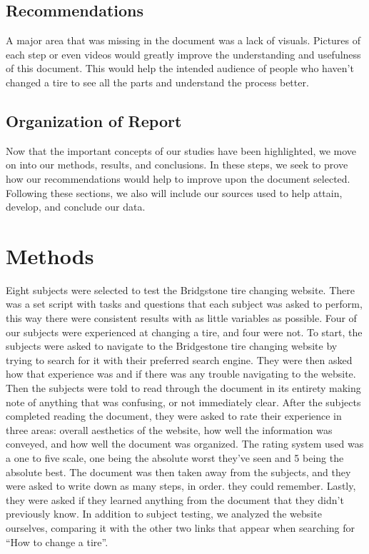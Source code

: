 \documentclass[12pt,A4paper]{article}
\begin{document}
		\subsection{Recommendations}
		A major area that was missing in the document was a lack of visuals. Pictures of each step or even videos would greatly improve the understanding and usefulness of this document. This would help the intended audience of people who haven’t changed a tire to see all the parts and understand the process better.

		\subsection{Organization of Report}
		Now that the important concepts of our studies have been highlighted, we move on into our methods, results, and conclusions. In these steps, we seek to prove how our recommendations would help to improve upon the document selected. Following these sections, we also will include our sources used to help attain, develop, and conclude our data.

	\section{Methods}
	Eight subjects were selected to test the Bridgstone tire changing website. There was a set script with tasks and questions that each subject was asked to perform, this way there were consistent results with as little variables as possible. Four of our subjects were experienced at changing a tire, and four were not. To start, the subjects were asked to navigate to the Bridgestone tire changing website by trying to search for it with their preferred search engine. They were then asked how that experience was and if there was any trouble navigating to the website. Then the subjects were told to read through the document in its entirety making note of anything that was confusing, or not immediately clear. After the subjects completed reading the document, they were asked to rate their experience in three areas: overall aesthetics of the website, how well the information was conveyed, and how well the document was organized. The rating system used was a one to five scale, one being the absolute worst they’ve seen and 5 being the absolute best. The document was then taken away from the subjects, and they were asked to write down as many steps, in order. they could remember. Lastly, they were asked if they learned anything from the document that they didn’t previously know. In addition to subject testing, we analyzed the website ourselves, comparing it with the other two links that appear when searching for “How to change a tire”.
	\vspace{1.6 in}
\end{document}
